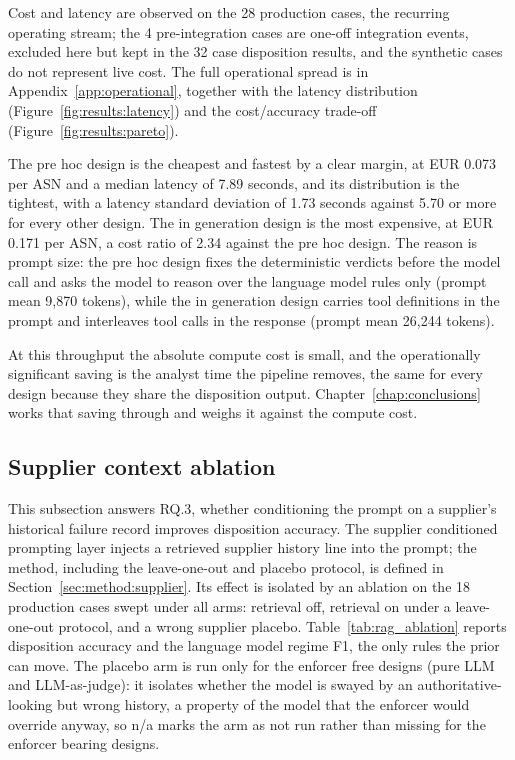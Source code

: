 Cost and latency are observed on the 28 production cases, the recurring operating stream; the 4 pre-integration cases are one-off integration events, excluded here but kept in the 32 case disposition results, and the synthetic cases do not represent live cost. The full operational spread is in Appendix~\ref{app:operational}, together with the latency distribution (Figure~\ref{fig:results:latency}) and the cost/accuracy trade-off (Figure~\ref{fig:results:pareto}).

The pre hoc design is the cheapest and fastest by a clear margin, at EUR 0.073 per ASN and a median latency of 7.89 seconds, and its distribution is the tightest, with a latency standard deviation of 1.73 seconds against 5.70 or more for every other design. The in generation design is the most expensive, at EUR 0.171 per ASN, a cost ratio of 2.34 against the pre hoc design. The reason is prompt size: the pre hoc design fixes the deterministic verdicts before the model call and asks the model to reason over the language model rules only (prompt mean 9,870 tokens), while the in generation design carries tool definitions in the prompt and interleaves tool calls in the response (prompt mean 26,244 tokens).

At this throughput the absolute compute cost is small, and the operationally significant saving is the analyst time the pipeline removes, the same for every design because they share the disposition output. Chapter~\ref{chap:conclusions} works that saving through and weighs it against the compute cost.


\subsection{Supplier context ablation}
\label{sec:results:rag}

This subsection answers RQ.3, whether conditioning the prompt on a supplier's historical failure record improves disposition accuracy. The supplier conditioned prompting layer injects a retrieved supplier history line into the prompt; the method, including the leave-one-out and placebo protocol, is defined in Section~\ref{sec:method:supplier}. Its effect is isolated by an ablation on the 18 production cases swept under all arms: retrieval off, retrieval on under a leave-one-out protocol, and a wrong supplier placebo. Table~\ref{tab:rag_ablation} reports disposition accuracy and the language model regime F1, the only rules the prior can move. The placebo arm is run only for the enforcer free designs (pure LLM and LLM-as-judge): it isolates whether the model is swayed by an authoritative-looking but wrong history, a property of the model that the enforcer would override anyway, so n/a marks the arm as not run rather than missing for the enforcer bearing designs.

